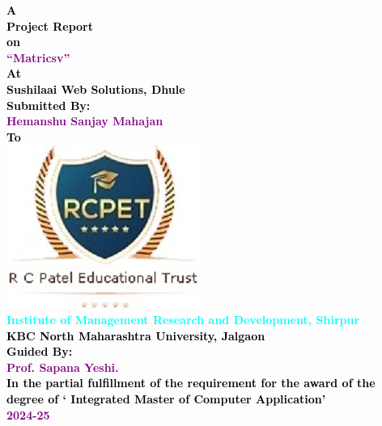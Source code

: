 \thispagestyle{empty}

   \begin{center}
   \Huge \bfseries \textcolor{black} {A}\\[.2cm]
   \Huge \bfseries \textcolor{black} {Project Report}\\[.2cm]
	\Huge \bfseries \textcolor{black} {on}\\[.2cm]
   \huge \bfseries \textcolor{purple} {``Matricsv''}\\[.8cm]
   \Huge \bfseries \textcolor{black} {At}\\[.2cm]
   \Huge \bfseries \textcolor{black} {Sushilaai Web Solutions, Dhule}\\[.9cm]
   \large \bfseries \textcolor{black} {Submitted By:}\\[.2cm]
     \Large \bfseries \textcolor{purple} {Hemanshu Sanjay Mahajan}\\[.8cm]
     \Large \bfseries \textcolor{black} {To}\\[.2cm]
      \includegraphics[scale=0.5]{Title/111}\\[0.1cm]
      \Large \bfseries \textcolor{cyan} { Institute of Management Research and Development, Shirpur}\\[0.1cm]
  
      
   \Large \bfseries \textcolor{black} {KBC North Maharashtra University, Jalgaon }\\[.7cm]
   \large \bfseries \textcolor{black} {Guided By:}\\[.2cm]

   \Large \bfseries \textcolor{purple} {Prof. Sapana Yeshi.}\\[1cm]
  
   \large \bfseries \textcolor{black} {  In the partial fulfillment of the requirement for the award of the degree of ‘ Integrated Master of Computer Application’}\\[0.12cm]
   
   \huge \bfseries \textcolor{purple} {2024-25}\\[0.1cm]
\end{center}
